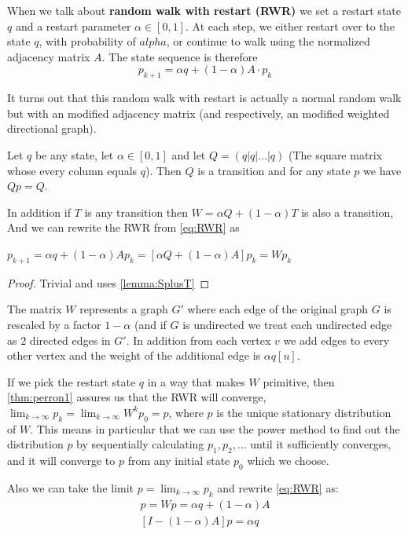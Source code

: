 When we talk about \textbf{random walk with restart (RWR)} we set a restart
state $q$ and a restart parameter $\alpha \in [0,1]$. At each step, we
either restart over to the state $q$, with probability of
$alpha$, or continue to walk using the normalized adjacency matrix
$A$. The state sequence is therefore
\begin{equation}
\label{eq:RWR}
p_{k+1} = \alpha q + (1 -
\alpha) A \cdot p_k
\end{equation}

It turns out that this random walk with restart is actually a normal
random walk but with an modified adjacency matrix (and respectively, an
modified weighted directional graph). 

\begin{lemma}
\label{lemma:Qq}
Let $q$ be any state, let $\alpha \in [0,1]$ and let  
$ Q = (q|q|\dots|q)$ (The square matrix whose every column equals $q$).
Then $Q$ is a transition and for any state $p$ we have $Qp = Q$.

In addition if $T$ is any transition then $W = \alpha Q + (1-\alpha)
T$ is also a transition, And we can rewrite the RWR from
\ref{eq:RWR} as

$p_{k+1} = \alpha q + (1 - \alpha) Ap_k = 
[\alpha Q + (1 - \alpha) A] p_k = W p_k$

\begin{proof}
Trivial and uses \ref{lemma:SplusT}
\end{proof}
\end{lemma}

The matrix $W$ represents a graph $G'$ where each edge of the
original graph $G$ is rescaled by a factor $1 - \alpha$ (and if $G$ is
undirected we treat each undirected edge as $2$ directed edges in
$G'$. In addition from each vertex $v$ we add edges to every other
vertex and the weight of the additional edge is $\alpha q[u]$.

If we pick the restart state $q$ in a way that makes $W$ primitive,
then \ref{thm:perron1} assures us that the RWR will converge,
$\lim_{k \to \infty} p_k =\lim_{k \to \infty} W^k p_0 = p$, where
$p$ is the unique stationary distribution of $W$. This means in
particular that we can use the power method to find out the
distribution $p$ by sequentially calculating $p_1, p_2, \dots$ until
it sufficiently converges, and it will converge to $p$ from any
initial state $p_0$ which we choose. 

Also we can take the limit $p = \lim_{k \to \infty}p_k$ and rewrite
\ref{eq:RWR} as:
\begin{equation}
\label{eq:RWR2}
\begin{aligned}
p = Wp = \alpha q + (1 - \alpha) A \\
[I - (1 - \alpha)A] p = \alpha q
\end{aligned}
\end{equation}


